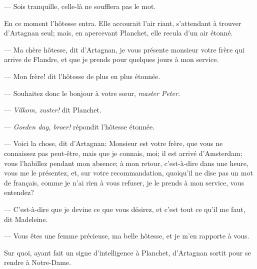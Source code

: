 — Sois tranquille, celle-là ne soufflera pas le mot.

En ce moment l'hôtesse entra. Elle accourait l'air riant, s'attendant à trouver d'Artagnan seul; mais, en apercevant Planchet, elle recula d'un air étonné.

— Ma chère hôtesse, dit d'Artagnan, je vous présente monsieur votre frère qui arrive de Flandre, et que je prends pour quelques jours à mon service.

— Mon frère! dit l'hôtesse de plus en plus étonnée.

— Souhaitez donc le bonjour à votre sœur, \textit{master Peter.}

— \textit{Vilkom, zuster!} dit Planchet.

— \textit{Goeden day, broer!} répondit l'hôtesse étonnée.

— Voici la chose, dit d'Artagnan: Monsieur est votre frère, que vous ne connaissez pas peut-être, mais que je connais, moi; il est arrivé d'Amsterdam; vous l'habillez pendant mon absence; à mon retour, c'est-à-dire dans une heure, vous me le présentez, et, sur votre recommandation, quoiqu'il ne dise pas un mot de français, comme je n'ai rien à vous refuser, je le prends à mon service, vous entendez?

— C'est-à-dire que je devine ce que vous désirez, et c'est tout ce qu'il me faut, dit Madeleine.

— Vous êtes une femme précieuse, ma belle hôtesse, et je m'en rapporte à vous.

Sur quoi, ayant fait un signe d'intelligence à Planchet, d'Artagnan sortit pour se rendre à Notre-Dame.